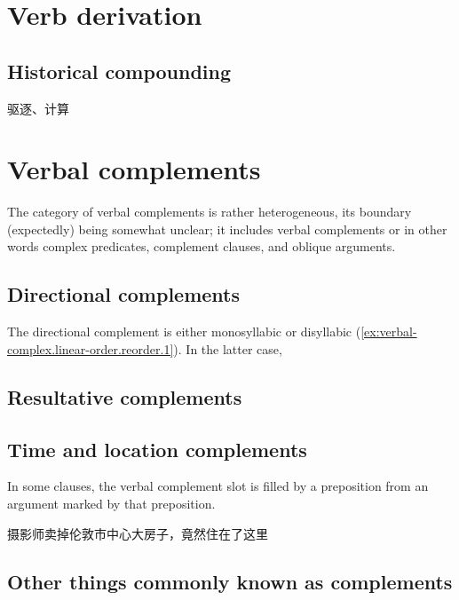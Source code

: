 \documentclass[UTF8, a4paper, oneside, scheme=plain, 12pt]{ctexrep}
\begin{document}
\section{Verb derivation}

\subsection{Historical compounding}\label{sec:verbal-complex.derivation.compound}

驱逐、计算


\section{Verbal complements}\label{sec:verbal-complex.complement}

The category of verbal complements is rather heterogeneous,
its boundary (expectedly) being somewhat unclear;
it includes verbal complements or in other words complex predicates, 
complement clauses, 
and oblique arguments. 

\subsection{Directional complements}\label{sec:verbal-complex.directional}

The directional complement is either monosyllabic or disyllabic
(\ref{ex:verbal-complex.linear-order.reorder.1}).
In the latter case, 

\subsection{Resultative complements}\label{sec:verbal-complex.resultative}

\subsection{Time and location complements}\label{sec:verbal-complex.prepositional}

In some clauses, the verbal complement slot is filled by a preposition
from an argument marked by that preposition.

\begin{exe}
    \ex 摄影师卖掉伦敦市中心大房子，竟然住在了这里
\end{exe}

\subsection{Other things commonly known as complements}
\end{document}
